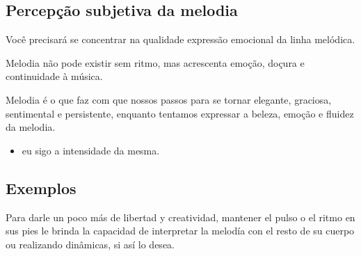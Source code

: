 \subsection{Percepção subjetiva da melodia} 

Você precisará se concentrar na qualidade expressão emocional da linha melódica.

Melodia não pode existir sem ritmo, mas acrescenta emoção, doçura e continuidade à música.

Melodia é o que faz com que nossos passos para se tornar elegante, 
graciosa, sentimental e persistente, enquanto tentamos expressar a beleza, emoção e fluidez da melodia.


\begin{itemize}
\item eu sigo a intensidade da mesma.
\end{itemize}

\subsection{Exemplos} 

Para darle un poco más de libertad y creatividad, 
mantener el pulso o el ritmo en sus pies le brinda la capacidad de interpretar 
la melodía con el resto de su cuerpo ou realizando dinâmicas, si así lo desea.


